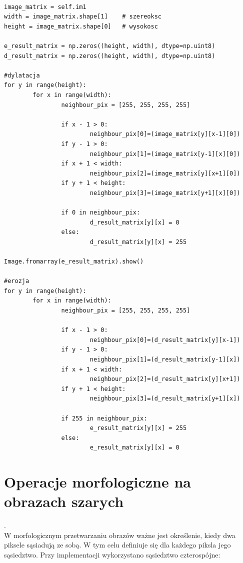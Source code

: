 \documentclass[final,a4paper,openany,12pt]{mwbk}
\begin{document}
\begin{lstlisting}[caption= Operacja zamknięcia na obrazie binarnym]

image_matrix = self.im1
width = image_matrix.shape[1]    # szereoksc
height = image_matrix.shape[0]   # wysokosc

e_result_matrix = np.zeros((height, width), dtype=np.uint8)
d_result_matrix = np.zeros((height, width), dtype=np.uint8)

#dylatacja
for y in range(height):
        for x in range(width):  
                neighbour_pix = [255, 255, 255, 255]

                if x - 1 > 0:
                        neighbour_pix[0]=(image_matrix[y][x-1][0])
                if y - 1 > 0:
                        neighbour_pix[1]=(image_matrix[y-1][x][0])
                if x + 1 < width:
                        neighbour_pix[2]=(image_matrix[y][x+1][0])
                if y + 1 < height:
                        neighbour_pix[3]=(image_matrix[y+1][x][0])

                if 0 in neighbour_pix:
                        d_result_matrix[y][x] = 0
                else:
                        d_result_matrix[y][x] = 255

Image.fromarray(e_result_matrix).show()

#erozja
for y in range(height):
        for x in range(width):  
                neighbour_pix = [255, 255, 255, 255]

                if x - 1 > 0:
                        neighbour_pix[0]=(d_result_matrix[y][x-1])
                if y - 1 > 0:
                        neighbour_pix[1]=(d_result_matrix[y-1][x])
                if x + 1 < width:
                        neighbour_pix[2]=(d_result_matrix[y][x+1])
                if y + 1 < height:
                        neighbour_pix[3]=(d_result_matrix[y+1][x])

                if 255 in neighbour_pix:
                        e_result_matrix[y][x] = 255
                else:
                        e_result_matrix[y][x] = 0         

\end{lstlisting}


\chapter {Operacje morfologiczne na obrazach szarych}
.\hfill\\
\indent
W morfologicznym przetwarzaniu obrazów ważne jest określenie, kiedy dwa piksele sąsiadują ze sobą. W tym celu definiuje się dla każdego piksla jego sąsiedztwo. Przy implementacji wykorzystano sąsiedztwo czterospójne: 
\end{document}
